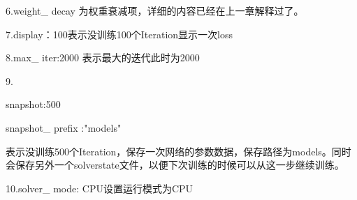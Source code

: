     6.weight\_ decay 为权重衰减项，详细的内容已经在上一章解释过了。
    
    7.display：100表示没训练100个Iteration显示一次loss
    
    8.max\_ iter:2000 表示最大的迭代此时为2000
    
    9.
    
    snapshot:500
    
    snapshot\_ prefix :"models" 
    
    表示没训练500个Iteration，保存一次网络的参数数据，保存路径为models。同时会保存另外一个solverstate文件，以便下次训练的时候可以从这一步继续训练。
    
    10.solver\_ mode: CPU设置运行模式为CPU







